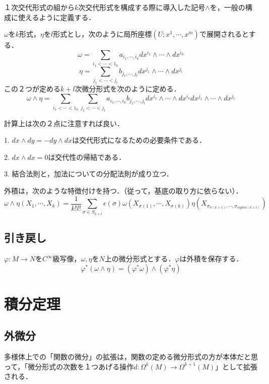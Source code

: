 \documentclass[uplatex, dvipdfmx]{jsreport}
\begin{document}
１次交代形式の組から$k$次交代形式を構成する際に導入した記号$\wedge$を，一般の構成に使えるように定義する．
\begin{definition}

    $\omega$を$k$形式，$\eta$を$l$形式とし，次のように局所座標$(U;x^1,\cdots,x^m)$で展開されるとする．
    \[ \omega=\sum_{i_1<\cdots<1_k}a_{i_1,\cdots,i_k}dx^{i_1}\wedge\cdots\wedge dx^{i_k} \]
    \[ \eta=\sum_{j_1<\cdots<j_l}b_{j_1,\cdots,j_l}dx^{j_1}\wedge\cdots\wedge dx^{j_l} \]
    この２つが定める$k+l$次微分形式を次のように定める．
    \[ \omega\wedge\eta = \sum_{i_1<\cdots<1_k}\sum_{j_1<\cdots<j_l}a_{i_1,\cdots,i_k}b_{j_1,\cdots,j_l}dx^{i_1}\wedge\cdots\wedge dx^{i_k}dx^{j_1}\wedge\cdots\wedge dx^{j_l} \]
\end{definition}
\begin{remark}
    計算上は次の２点に注意すれば良い．

    1. $dx\wedge dy=-dy\wedge dx$は交代形式になるための必要条件である．

    2. $dx\wedge dx=0$は交代性の帰結である．

    3. 結合法則と，加法についての分配法則が成り立つ．
\end{remark}

\begin{proposition}
    外積は，次のような特徴付けを持つ．（従って，基底の取り方に依らない）．
    \[ \omega\wedge\eta(X_1,\cdots,X_k)=\frac{1}{k!l!}\sum_{\sigma\in S_{k+l}}\epsilon(\sigma)\omega(X_{\sigma(1)},\cdots,X_{\sigma(k)})\eta(X_{\sigma_{\sigma(k+1)},\cdots,\sigma_{sigma(k+l)}}) \]
\end{proposition}

\section{引き戻し}

\begin{proposition}

    $\varphi:M\to N$を$C^\infty$級写像，$\omega,\eta$を$N$上の微分形式とする．$\varphi$は外積を保存する．
    \[ \varphi^*(\omega\wedge\eta)=(\varphi^*\omega)\wedge (\varphi^*\eta) \]
\end{proposition}

\chapter{積分定理}

\section{外微分}
多様体上での「関数の微分」の拡張は，関数の定める微分形式の方が本体だと思って，「微分形式の次数を１つあげる操作$d:\Omega^k(M)\to\Omega^{k+1}(M)$」として拡張される．
\end{document}
